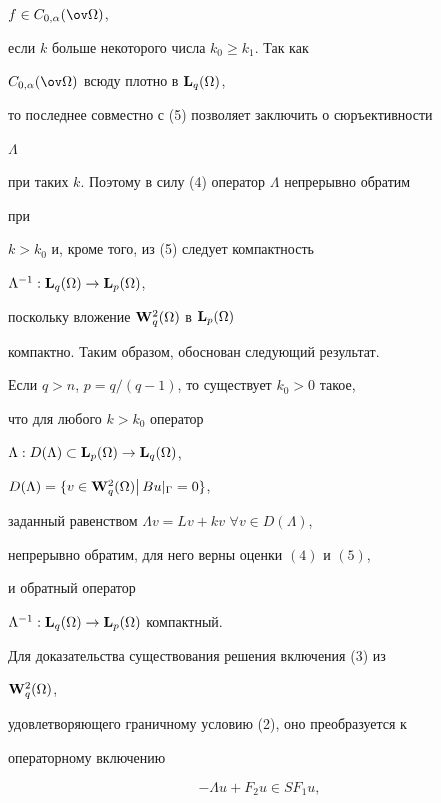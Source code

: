 $f\in C_{0,\alpha}(\ov\Omega)$, 


если $k$ больше некоторого числа $k_0\ge k_1$. Так как 


$C_{0,\alpha}(\ov\Omega)$ всюду плотно в $\bold L_q(\Omega)$, 


то последнее совместно с (5) позволяет заключить о сюръективности 


$\Lambda$ 


при таких $k$. Поэтому в силу (4) оператор $\Lambda$ непрерывно обратим 


при 


$k>k_0$ и, кроме того, из (5) следует компактность 


$\Lambda^{-1}:\bold L_q(\Omega)\to\bold L_p(\Omega)$, 


поскольку вложение $\bold W^2_q(\Omega)$ в $\bold L_p(\Omega)$ 


компактно. Таким образом, обоснован следующий результат. 


 


\begin{thm} Если $q>n$, $p=q/(q-1)$, то существует $k_0>0$ такое, 


что для любого $k>k_0$ оператор 


$\Lambda:D(\Lambda)\subset\bold L_p(\Omega)\to\bold L_q(\Omega)$, 


$D(\Lambda)=\{v\in\bold W^2_q(\Omega)\big|\,Bu|_\Gamma=0\}$, 


заданный равенством $\Lambda v=Lv+kv$\; $\forall v\in D(\Lambda)$, 


непрерывно обратим, для него верны оценки $(4)$ и $(5)$, 


и обратный оператор 


$\Lambda^{-1}:\bold L_q(\Omega)\to\bold L_p(\Omega)$ компактный. 


\end{thm} 


 


Для доказательства существования решения включения (3) из 


$\bold W^2_q(\Omega)$, 


удовлетворяющего граничному условию (2), оно преобразуется к 


операторному включению 


\begin{equation} 


-\Lambda u+F_2u\in S F_1u, 


\end{equation} 


